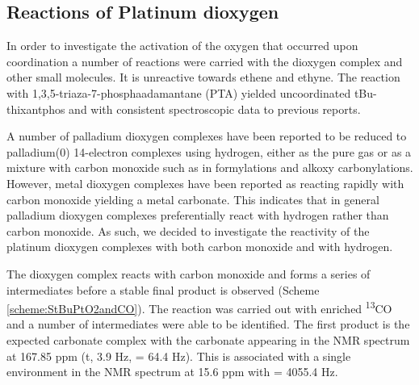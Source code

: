 
\subsection{Reactions of Platinum dioxygen}

In order to investigate the activation of the oxygen that occurred upon coordination a number of reactions were carried with the dioxygen complex and other small molecules.  It is unreactive towards ethene and ethyne.  The reaction with 1,3,5-triaza-7-phosphaadamantane (PTA) yielded uncoordinated tBu-thixantphos and \ce{[Pt(PTA)4]} with consistent spectroscopic data to previous reports. 

A number of palladium dioxygen complexes have been reported to be reduced to palladium(0) 14-electron complexes using hydrogen, either as the pure gas or as a mixture with carbon monoxide such as in formylations and alkoxy carbonylations.\cite{Sergeev2010}  However, metal dioxygen complexes have been reported as reacting rapidly with carbon monoxide yielding a metal carbonate.\cite{Goel1983b}  This indicates that in general palladium dioxygen complexes preferentially react with hydrogen rather than carbon monoxide.  As such, we decided to investigate the reactivity of the platinum dioxygen complexes with both carbon monoxide and with hydrogen.  
  
The dioxygen complex  reacts with carbon monoxide and forms a series of intermediates before a stable final product is observed (Scheme \ref{scheme:StBuPtO2andCO}).  The reaction was carried out with enriched \textsuperscript{13}CO and a number of intermediates were able to be identified.  The first product is the expected carbonate complex   with the carbonate appearing in the \carbon{} NMR spectrum at 167.85 ppm (t, 3.9 Hz, \JPtC{} = 64.4 Hz).  This is associated with a single environment in the \phosphorus{} NMR spectrum at 15.6 ppm with \JPtP{} = 4055.4 Hz.

